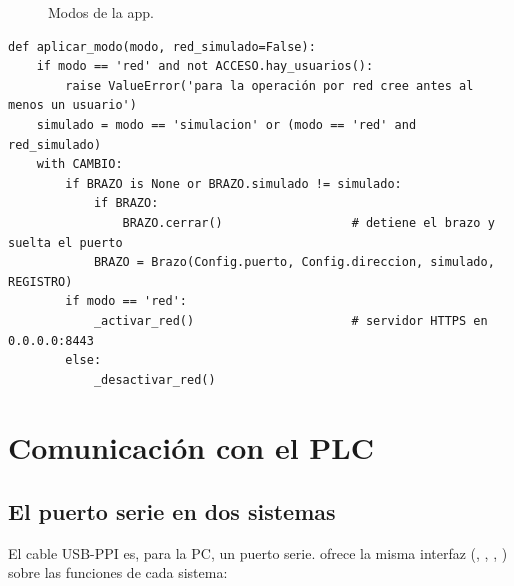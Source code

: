 \documentclass[a4paper,11pt]{article}
\begin{document}
\begin{figure}[H]
\centering
{}
\caption{Modos de la app.}
\end{figure}

\begin{lstlisting}[style=py, caption={Cambio de modo (\texttt{gemelo\_brazo.py}).}]
def aplicar_modo(modo, red_simulado=False):
    if modo == 'red' and not ACCESO.hay_usuarios():
        raise ValueError('para la operación por red cree antes al menos un usuario')
    simulado = modo == 'simulacion' or (modo == 'red' and red_simulado)
    with CAMBIO:
        if BRAZO is None or BRAZO.simulado != simulado:
            if BRAZO:
                BRAZO.cerrar()                  # detiene el brazo y suelta el puerto
            BRAZO = Brazo(Config.puerto, Config.direccion, simulado, REGISTRO)
        if modo == 'red':
            _activar_red()                      # servidor HTTPS en 0.0.0.0:8443
        else:
            _desactivar_red()
\end{lstlisting}

\section{Comunicación con el PLC}
\subsection{El puerto serie en dos sistemas}
El cable USB-PPI es, para la PC, un puerto serie.  ofrece la misma interfaz (, , , ) sobre las funciones de cada sistema:
\end{document}
